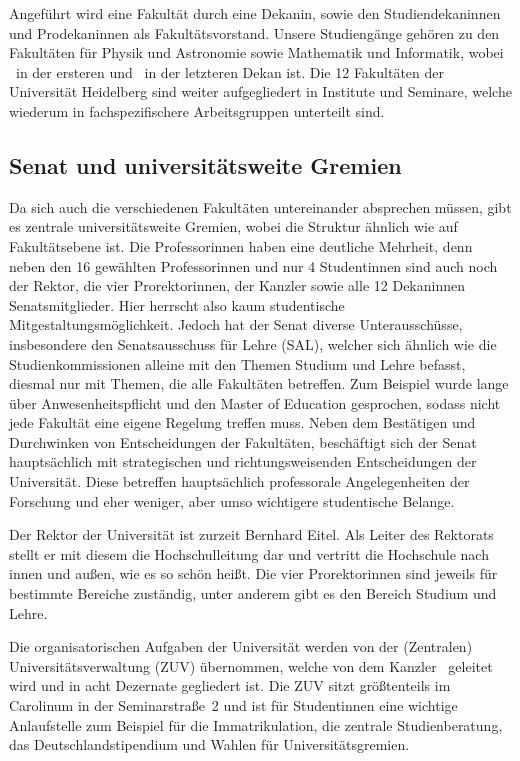 Angeführt wird eine Fakultät durch eine Dekanin, sowie den Studiendekaninnen und Prodekaninnen als Fakultätsvorstand. Unsere Studiengänge gehören zu den Fakultäten für Physik und Astronomie sowie Mathematik und Informatik, wobei \dekanphysik\ in der ersteren und \dekanmathe\ in der letzteren Dekan ist. Die 12 Fakultäten der Universität Heidelberg sind weiter aufgegliedert in Institute und Seminare, welche wiederum in fachspezifischere Arbeitsgruppen unterteilt sind. 

\subsection{Senat und universitätsweite Gremien}
Da sich auch die verschiedenen Fakultäten untereinander absprechen müssen, gibt es zentrale universitätsweite Gremien, wobei die Struktur ähnlich wie auf Fakultätsebene ist. Die Professorinnen haben eine deutliche Mehrheit, denn neben den 16 gewählten Professorinnen und nur 4 Studentinnen sind auch noch der Rektor, die vier Prorektorinnen, der Kanzler sowie alle 12 Dekaninnen Senatsmitglieder. Hier herrscht also kaum studentische Mitgestaltungsmöglichkeit. Jedoch hat der Senat diverse Unterausschüsse, insbesondere den Senatsausschuss für Lehre (SAL), welcher sich ähnlich wie die Studienkommissionen alleine mit den Themen Studium und Lehre befasst, diesmal nur mit Themen, die alle Fakultäten betreffen. Zum Beispiel wurde lange über Anwesenheitspflicht und den Master of Ed\-u\-ca\-tion gesprochen, sodass nicht jede Fakultät eine eigene Regelung treffen muss. Neben dem Bestätigen und Durchwinken von Entscheidungen der Fakultäten, beschäftigt sich der Senat hauptsächlich mit strategischen und richtungsweisenden Entscheidungen der Universität. 
Diese betreffen hauptsächlich professorale Angelegenheiten der Forschung und eher weniger, aber umso wichtigere studentische Belange. 

Der Rektor der Universität ist zurzeit Bernhard Eitel. Als Leiter des Rektorats stellt er mit diesem die Hochschulleitung dar und vertritt die Hochschule nach innen und außen, wie es so schön heißt. Die vier Prorektorinnen sind jeweils für bestimmte Bereiche zuständig, unter anderem gibt es den Bereich Studium und Lehre. 

Die organisatorischen Aufgaben der Universität werden von der (Zentralen) Universitätsverwaltung (ZUV) übernommen, welche von dem Kanzler \kanzler\ geleitet wird und in acht Dezernate gegliedert ist. Die ZUV sitzt größtenteils im Carolinum in der Seminarstraße~2 und ist für Studentinnen eine wichtige Anlaufstelle zum Beispiel für die Immatrikulation, die zentrale Studienberatung, das Deutschlandstipendium und Wahlen für Universitätsgremien.

